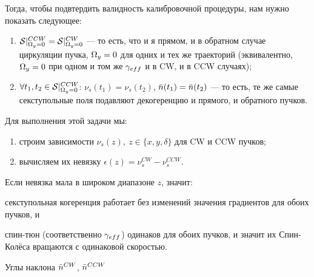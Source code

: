 Тогда, чтобы подвтердить валидность калибровочной процедуры, нам нужно показать следующее:
\begin{enumerate}
\item $\Stab*^{CCW} = \Stab*^{CW}$ --- то есть, что и я прямом, и в обратном случае циркуляции пучка,
  $\Omega_y = 0$ для одних и тех же траекторий (эквивалентно, $\Omega_y=0$ при одном и том же $\g*$ и в CW, и в CCW
  случаях);
\item $\forall t_1,t_2\in\Stab*^{CCW}$: $\nu_s(t_1) = \nu_s(t_2)$, $\bar n(t_1) = \bar n(t_2)$ ---
  то есть, те же самые секступольные поля подавляют декогеренцию и прямого, и обратного пучков.
\end{enumerate}

Для выполнения этой задачи мы:
\begin{enumerate}
\item строим зависимости $\nu_s(z),~z\in\{x,y,\delta\}$ для CW и CCW пучков;
\item вычисляем их невязку $\epsilon(z) = \nu_s^{CW} - \nu_s^{CCW}$.
\end{enumerate}

Если невязка мала в широком диапазоне $z$, значит:
\begin{inparaenum}[1)]
\item секступольная когеренция работает без изменений значения градиентов для обоих пучков, и
\item спин-тюн (соответственно $\g*$) одинаков для обоих пучков, и значит их Спин-Колёса
вращаются с одинаковой скоростью.
\end{inparaenum}

Углы наклона $\bar n^{CW}$, $\bar n^{CCW}$ 





